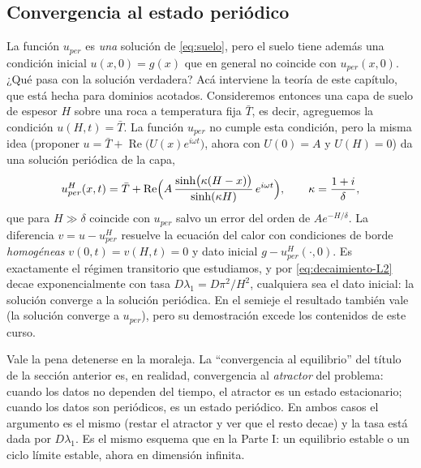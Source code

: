 \documentclass[12pt, a4paper]{amsbook}
\renewcommand{\Re}{\operatorname{Re}}
\theoremstyle{remark}
\theoremstyle{definition}
\numberwithin{section}{chapter}
\numberwithin{subsection}{section}
\numberwithin{equation}{section}
\numberwithin{figure}{chapter}
\begin{document}
\subsection*{Convergencia al estado periódico}

La función $u_{per}$ es \emph{una} solución de \eqref{eq:suelo}, pero el suelo tiene además una condición inicial $u(x,0)=g(x)$ que en general no coincide con $u_{per}(x,0)$. ¿Qué pasa con la solución verdadera? Acá interviene la teoría de este capítulo, que está hecha para dominios acotados. Consideremos entonces una capa de suelo de espesor $H$ sobre una roca a temperatura fija $\bar T$, es decir, agreguemos la condición $u(H,t)=\bar T$. La función $u_{per}$ no cumple esta condición, pero la misma idea (proponer $u=\bar T+\Re\bigl(U(x)e^{i\omega t}\bigr)$, ahora con $U(0)=A$ y $U(H)=0$) da una solución periódica de la capa,
$$
u^H_{per}(x,t)=\bar T+\Re\Bigl(A\,\frac{\sinh\bigl(\kappa(H-x)\bigr)}{\sinh(\kappa H)}\,e^{i\omega t}\Bigr),\qquad \kappa=\frac{1+i}{\delta},
$$
que para $H\gg\delta$ coincide con $u_{per}$ salvo un error del orden de $Ae^{-H/\delta}$. La diferencia $v = u - u^H_{per}$ resuelve la ecuación del calor con condiciones de borde \emph{homogéneas} $v(0,t)=v(H,t)=0$ y dato inicial $g - u^H_{per}(\cdot,0)$. Es exactamente el régimen transitorio que estudiamos, y por \eqref{eq:decaimiento-L2} decae exponencialmente con tasa $D\lambda_1 = D\pi^2/H^2$, cualquiera sea el dato inicial: la solución converge a la solución periódica. En el semieje el resultado también vale (la solución converge a $u_{per}$), pero su demostración excede los contenidos de este curso.

Vale la pena detenerse en la moraleja. La ``convergencia al equilibrio'' del título de la sección anterior es, en realidad, convergencia al \emph{atractor} del problema: cuando los datos no dependen del tiempo, el atractor es un estado estacionario; cuando los datos son periódicos, es un estado periódico. En ambos casos el argumento es el mismo (restar el atractor y ver que el resto decae) y la tasa está dada por $D\lambda_1$. Es el mismo esquema que en la Parte I: un equilibrio estable o un ciclo límite estable, ahora en dimensión infinita.
\end{document}
